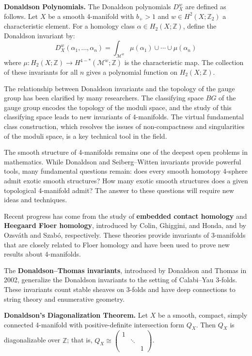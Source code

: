 \textbf{Donaldson Polynomials.} The Donaldson polynomials $D_X^w$ are defined as follows. Let $X$ be a smooth 4-manifold with $b_+ > 1$ and $w \in H^2(X;\mathbb{Z}_2)$ a characteristic element. For a homology class $\alpha \in H_2(X;\mathbb{Z})$, define the Donaldson invariant by:
\[
D_X^w(\alpha_1, \ldots, \alpha_n) = \int_{\mathcal{M}^w} \mu(\alpha_1) \cup \cdots \cup \mu(\alpha_n)
\]
where $\mu: H_2(X;\mathbb{Z}) \to H^{4-*}(\mathcal{M}^w;\mathbb{Z})$ is the characteristic map. The collection of these invariants for all $n$ gives a polynomial function on $H_2(X;\mathbb{Z})$.

The relationship between Donaldson invariants and the topology of the gauge group has been clarified by many researchers. The classifying space $BG$ of the gauge group encodes the topology of the moduli space, and the study of this classifying space leads to new invariants of 4-manifolds. The virtual fundamental class construction, which resolves the issues of non-compactness and singularities of the moduli space, is a key technical tool in the field.

The smooth structure of 4-manifolds remains one of the deepest open problems in mathematics. While Donaldson and Seiberg--Witten invariants provide powerful tools, many fundamental questions remain: does every smooth homotopy 4-sphere admit exotic smooth structures? How many exotic smooth structures does a given topological 4-manifold admit? The answer to these questions will require new ideas and techniques.

Recent progress has come from the study of \textbf{embedded contact homology} and \textbf{Heegaard Floer homology}, introduced by Colin, Ghiggini, and Honda, and by Ozsv\'ath and Szab\'o, respectively. These theories provide invariants of 3-manifolds that are closely related to Floer homology and have been used to prove new results about 4-manifolds.

The \textbf{Donaldson--Thomas invariants}, introduced by Donaldson and Thomas in 2002, generalize the Donaldson invariants to the setting of Calabi--Yau 3-folds. These invariants count stable sheaves on 3-folds and have deep connections to string theory and enumerative geometry.

\textbf{Donaldson's Diagonalization Theorem.} Let $X$ be a smooth, compact, simply connected 4-manifold with positive-definite intersection form $Q_X$. Then $Q_X$ is diagonalizable over $\mathbb{Z}$; that is, $Q_X \cong \begin{pmatrix} 1 & & \\ & \ddots & \\ & & 1 \end{pmatrix}$.

